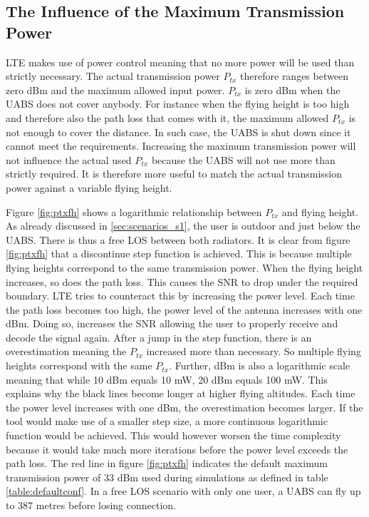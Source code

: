 \subsection{The Influence of the Maximum Transmission Power}
\label{s1a}
\gls{LTE} makes use of power control meaning that no more power will be used than strictly necessary. The actual 
transmission power $P_{tx}$ therefore ranges between zero dBm and the maximum allowed input power. $P_{tx}$ is zero dBm when the \gls{UABS} does not cover anybody.
For instance when the flying height is too high and therefore also the path loss that comes with it, the maximum allowed $P_{tx}$ is not enough to cover 
the distance. In such case, the \gls{UABS} is shut down since it cannot meet the requirements.
Increasing the maximum transmission power will not influence the actual used $P_{tx}$ because the \gls{UABS} will not use more
than strictly required. It is therefore more useful to match the actual transmission power against a variable flying height. 

Figure \ref{fig:ptxfh} shows a logarithmic relationship between $P_{tx}$ and flying height.
As already discussed in \ref{sec:scenarios_s1}, the user is outdoor and just below the \gls{UABS}. There is thus a free \gls{LOS} between both
radiators. It is clear from figure \ref{fig:ptxfh} that a discontinue step function is achieved. This is because multiple flying heights correspond to the same transmission power.
When the flying height increases, so does the path loss. This causes the \gls{SNR} to drop under the required boundary.
 \gls{LTE} tries to counteract this by increasing the power level. Each time 
the path loss becomes too high, the power level of the antenna increases with one dBm. 
Doing so, increases the \gls{SNR} allowing the user to properly receive and decode the signal again.
After a jump in the step function, there is an overestimation meaning the $P_{tx}$ increased more than necessary. So multiple flying heights correspond with the same $P_{tx}$.
Further, dBm is also a logarithmic scale meaning that while 10 dBm equals 10 mW, 20 dBm equals 100 mW. This explains why the black lines become longer at higher flying altitudes.
Each time the power level increases with one dBm, the overestimation becomes larger. If the tool would make use of a smaller step size, a more continuous 
logarithmic function would be achieved. This would however worsen the time complexity because it would take much more iterations before 
the power level exceeds the path loss. 
The red line in figure \ref{fig:ptxfh} indicates the default maximum transmission power of 33 dBm used during simulations as 
defined in table \ref{table:defaultconf}. 
In a free \gls{LOS} scenario with only one user, a \gls{UABS} can fly up to 387 metres before losing connection.

